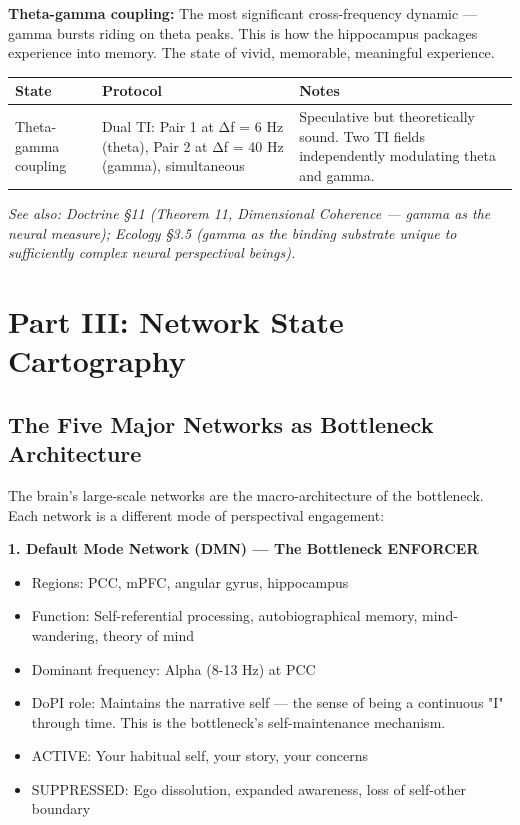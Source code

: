 \textbf{Theta-gamma coupling:} The most significant cross-frequency dynamic — gamma bursts riding on theta peaks. This is how the hippocampus packages experience into memory. The state of vivid, memorable, meaningful experience.



\begin{longtable}{p{} p{} p{}}
\toprule
\textbf{State} & \textbf{Protocol} & \textbf{Notes} \\
\midrule
\endhead
Theta-gamma coupling & Dual TI: Pair 1 at Δf = 6 Hz (theta), Pair 2 at Δf = 40 Hz (gamma), simultaneous & Speculative but theoretically sound. Two TI fields independently modulating theta and gamma. \\
\bottomrule
\end{longtable}



\textit{See also: Doctrine §11 (Theorem 11, Dimensional Coherence — gamma as the neural measure); Ecology §3.5 (gamma as the binding substrate unique to sufficiently complex neural perspectival beings).}


\bigskip\noindent\makebox[\textwidth]{\color{rulegray}\rule{5cm}{0.3pt}}\bigskip


\section*{Part III: Network State Cartography}


\subsection*{The Five Major Networks as Bottleneck Architecture}


The brain's large-scale networks are the macro-architecture of the bottleneck. Each network is a different mode of perspectival engagement:


\textbf{1. Default Mode Network (DMN) — The Bottleneck ENFORCER}

\begin{itemize}[nosep,leftmargin=*]
  \item Regions: PCC, mPFC, angular gyrus, hippocampus
  \item Function: Self-referential processing, autobiographical memory, mind-wandering, theory of mind
  \item Dominant frequency: Alpha (8-13 Hz) at PCC
  \item DoPI role: Maintains the narrative self — the sense of being a continuous "I" through time. This is the bottleneck's self-maintenance mechanism.
  \item ACTIVE: Your habitual self, your story, your concerns
  \item SUPPRESSED: Ego dissolution, expanded awareness, loss of self-other boundary
\end{itemize}


